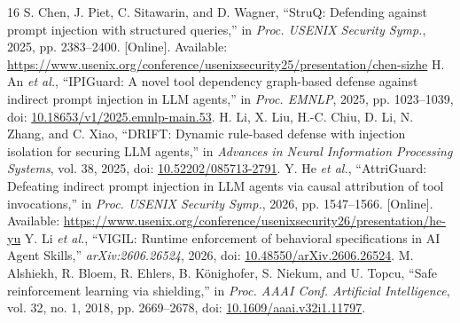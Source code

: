 \begin{thebibliography}{16}
 S. Chen, J. Piet, C. Sitawarin, and D. Wagner, ``StruQ: Defending against prompt injection with structured queries,'' in \emph{Proc. USENIX Security Symp.}, 2025, pp. 2383--2400. [Online]. Available: \url{https://www.usenix.org/conference/usenixsecurity25/presentation/chen-sizhe}
 H. An \emph{et al.}, ``IPIGuard: A novel tool dependency graph-based defense against indirect prompt injection in LLM agents,'' in \emph{Proc. EMNLP}, 2025, pp. 1023--1039, doi: \href{https://doi.org/10.18653/v1/2025.emnlp-main.53}{10.18653/v1/2025.emnlp-main.53}.
 H. Li, X. Liu, H.-C. Chiu, D. Li, N. Zhang, and C. Xiao, ``DRIFT: Dynamic rule-based defense with injection isolation for securing LLM agents,'' in \emph{Advances in Neural Information Processing Systems}, vol. 38, 2025, doi: \href{https://doi.org/10.52202/085713-2791}{10.52202/085713-2791}.
 Y. He \emph{et al.}, ``AttriGuard: Defeating indirect prompt injection in LLM agents via causal attribution of tool invocations,'' in \emph{Proc. USENIX Security Symp.}, 2026, pp. 1547--1566. [Online]. Available: \url{https://www.usenix.org/conference/usenixsecurity26/presentation/he-yu}
 Y. Li \emph{et al.}, ``VIGIL: Runtime enforcement of behavioral specifications in AI Agent Skills,'' \emph{arXiv:2606.26524}, 2026, doi: \href{https://doi.org/10.48550/arXiv.2606.26524}{10.48550/arXiv.2606.26524}.
 M. Alshiekh, R. Bloem, R. Ehlers, B. K\"onighofer, S. Niekum, and U. Topcu, ``Safe reinforcement learning via shielding,'' in \emph{Proc. AAAI Conf. Artificial Intelligence}, vol. 32, no. 1, 2018, pp. 2669--2678, doi: \href{https://doi.org/10.1609/aaai.v32i1.11797}{10.1609/aaai.v32i1.11797}.
\end{thebibliography}
